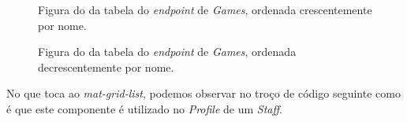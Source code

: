 \begin{figure}[h]
	\begin{center}
	\end{center}
	\caption{Figura do da tabela do \textit{endpoint} de \textit{Games}, ordenada crescentemente por nome.}\label{fig:gamessortednameup}
\end{figure}

\begin{figure}[h]
	\begin{center}
	\end{center}
	\caption{Figura do da tabela do \textit{endpoint} de \textit{Games}, ordenada decrescentemente por nome.}\label{fig:gamessortednameup}
\end{figure}



No que toca ao \textit{mat-grid-list}, podemos observar no troço de código seguinte como é que este componente é utilizado no \textit{Profile} de um \textit{Staff}.

